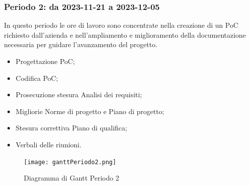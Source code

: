 \documentclass[10pt, a4paper]{article}
\begin{document}
{{{{{{{{\subsubsection{Periodo 2: da 2023-11-21 a 2023-12-05}
In questo periodo le ore di lavoro sono concentrate nella creazione di un PoC richiesto dall'azienda e nell'ampliamento e miglioramento della documentazione necessaria per guidare l'avanzamento del progetto.
\begin{itemize}
    \item Progettazione PoC;
    \item Codifica PoC;
    \item Prosecuzione stesura Analisi dei requisiti;
    \item Migliorie Norme di progetto e Piano di progetto;
    \item Stesura correttiva Piano di qualifica;
    \item Verbali delle riunioni.
  
\end{itemize}
\vspace{1em}

 \begin{figure}[H]
        \centering        
        \texttt{[image: ganttPeriodo2.png]}
        \caption{Diagramma di Gantt Periodo 2 }
    \end{figure}

}}}}}}}}
\end{document}
